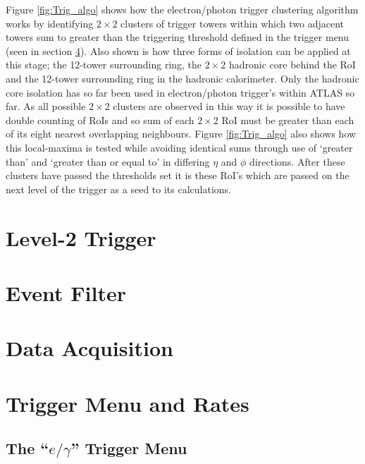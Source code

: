 	Figure \ref{fig:Trig_algo} shows how the electron/photon trigger clustering algorithm works by identifying $2 \times 2$ clusters of trigger towers within which two adjacent towers sum to greater than the triggering threshold defined in the trigger menu (seen in section \ref{sec:trig_menu}). Also shown is how three forms of isolation can be applied at this stage; the 12-tower surrounding ring, the $2 \times 2$ hadronic core behind the RoI and the 12-tower surrounding ring in the hadronic calorimeter. Only the hadronic core isolation has so far been used in electron/photon trigger's within ATLAS so far. 
	As all possible $2 \times 2$ clusters are observed in this way it is possible to have double counting of RoIs and so sum of each $2 \times 2$ RoI must be greater than each of its eight nearest overlapping neighbours. Figure \ref{fig:Trig_algo} also shows how this local-maxima is tested while avoiding identical sums through use of `greater than' and `greater than or equal to' in differing $\eta$ and $\phi$ directions. 
	After these clusters have passed the thresholds set it is these RoI's which are passed on the next level of the trigger as a seed to its calculations.





\section{Level-2 Trigger}




\section{Event Filter}





\section{Data Acquisition}




\section{Trigger Menu and Rates}
\label{sec:trig_menu}

\subsection{The ``$e/\gamma$'' Trigger Menu} 














